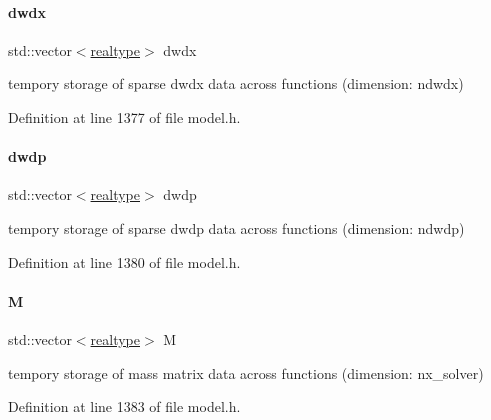 \mbox{\label{classamici_1_1_model_a58b93c923b4fd9c0322c969954696210}} 
\paragraph{\texorpdfstring{dwdx}{dwdx}}
{\footnotesize\ttfamily std\+::vector$<$\mbox{\hyperlink{namespaceamici_a1bdce28051d6a53868f7ccbf5f2c14a3}{realtype}}$>$ dwdx\hspace{0.3cm}{\ttfamily [protected]}}

tempory storage of sparse dwdx data across functions (dimension\+: ndwdx) 

Definition at line 1377 of file model.\+h.

\mbox{\label{classamici_1_1_model_ae0be4b469deded11a9b2569a4da9edea}} 
\paragraph{\texorpdfstring{dwdp}{dwdp}}
{\footnotesize\ttfamily std\+::vector$<$\mbox{\hyperlink{namespaceamici_a1bdce28051d6a53868f7ccbf5f2c14a3}{realtype}}$>$ dwdp\hspace{0.3cm}{\ttfamily [protected]}}

tempory storage of sparse dwdp data across functions (dimension\+: ndwdp) 

Definition at line 1380 of file model.\+h.

\mbox{\label{classamici_1_1_model_a0a114d4a6ddc9469fe5e5b4a31317d89}} 
\paragraph{\texorpdfstring{M}{M}}
{\footnotesize\ttfamily std\+::vector$<$\mbox{\hyperlink{namespaceamici_a1bdce28051d6a53868f7ccbf5f2c14a3}{realtype}}$>$ M\hspace{0.3cm}{\ttfamily [protected]}}

tempory storage of mass matrix data across functions (dimension\+: nx\+\_\+solver) 

Definition at line 1383 of file model.\+h.

\mbox{\label{classamici_1_1_model_a989f1b7cc176a86d9684f4ccecb16b0d}} 
